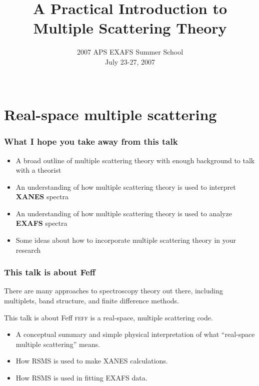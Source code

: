 \documentclass[10pt, xcolor=x11names, compress]{beamer}
\title{A Practical Introduction to Multiple Scattering Theory}
\date[APS EXAFS 07]{2007 APS EXAFS Summer School\\July 23-27, 2007\\~}
\begin{document}
\maketitle



\section{Real-space multiple scattering}

\begin{frame}
  \frametitle{What I hope you take away from this talk}
  \begin{itemize}
  \item A broad outline of multiple scattering theory with enough
    background to talk with a theorist
  \item An understanding of how multiple scattering theory is used to
    interpret \textbf{XANES} spectra
  \item An understanding of how multiple scattering theory is used to
    analyze \textbf{EXAFS} spectra
  \item Some ideas about how to incorporate multiple scattering theory
    in your research
  \end{itemize}
\end{frame}

\begin{frame}
  \frametitle{This talk is about Feff}

  There are many approaches to spectroscopy theory out there,
  including multiplets, band structure, and finite difference methods.

  \bigskip

  \begin{exampleblock}{This talk is about Feff}
    \textsc{feff} is a real-space, multiple scattering code.
  \end{exampleblock}
  
  \bigskip

  \begin{itemize}
  \item A conceptual summary and simple physical interpretation of
    what ``real-space multiple scattering'' means.
  \item How RSMS is used to make XANES calculations.
  \item How RSMS is used in fitting EXAFS data.
  \end{itemize}
\end{frame}



\end{document}
